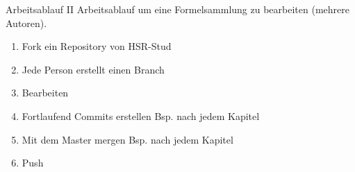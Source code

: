 \begin{frame}{Arbeitsablauf II}
Arbeitsablauf um eine Formelsammlung zu bearbeiten (mehrere Autoren).
\begin{enumerate}
	\item Fork ein Repository von HSR-Stud  \pause
	\item Jede Person erstellt einen Branch \pause
	\item Bearbeiten \pause
	\item Fortlaufend Commits erstellen Bsp. nach jedem Kapitel \pause
	\item Mit dem Master mergen Bsp. nach jedem Kapitel \pause
	\item Push
\end{enumerate}
\end{frame}
